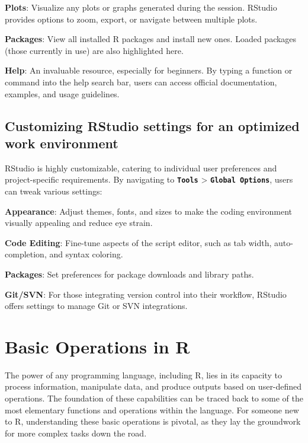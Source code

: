 \documentclass[
  b5paper]{book}
\begin{document}
\textbf{Plots}: Visualize any plots or graphs generated during the session. RStudio provides options to zoom, export, or navigate between multiple plots.

\textbf{Packages}: View all installed R packages and install new ones. Loaded packages (those currently in use) are also highlighted here.

\textbf{Help}: An invaluable resource, especially for beginners. By typing a function or command into the help search bar, users can access official documentation, examples, and usage guidelines.

\hypertarget{customizing-rstudio-settings-for-an-optimized-work-environment}{%
\subsection*{Customizing RStudio settings for an optimized work environment}\label{customizing-rstudio-settings-for-an-optimized-work-environment}}

RStudio is highly customizable, catering to individual user preferences and project-specific requirements. By navigating to \textbf{\texttt{Tools}} \textgreater{} \textbf{\texttt{Global\ Options}}, users can tweak various settings:

\textbf{Appearance}: Adjust themes, fonts, and sizes to make the coding environment visually appealing and reduce eye strain.

\textbf{Code Editing}: Fine-tune aspects of the script editor, such as tab width, auto-completion, and syntax coloring.

\textbf{Packages}: Set preferences for package downloads and library paths.

\textbf{Git/SVN}: For those integrating version control into their workflow, RStudio offers settings to manage Git or SVN integrations.

\hypertarget{basic-operations-in-r}{%
\section{Basic Operations in R}\label{basic-operations-in-r}}

The power of any programming language, including R, lies in its capacity to process information, manipulate data, and produce outputs based on user-defined operations. The foundation of these capabilities can be traced back to some of the most elementary functions and operations within the language. For someone new to R, understanding these basic operations is pivotal, as they lay the groundwork for more complex tasks down the road.
\end{document}
